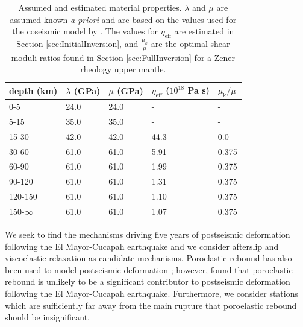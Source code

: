 \documentclass[draft,linenumbers]{AGUJournal}
\begin{document}
\begin{table}\label{tab:MaterialProperties}
\begin{tabular} {l l l l l}
depth (km) &$\lambda$ (GPa)&$\mu$ (GPa)&$\eta_\mathrm{eff}$ ($10^{18}$ Pa s) & $\mu_\mathrm{k}/\mu$\\ \hline
0-5 & 24.0 & 24.0 & - & -\\
5-15 & 35.0 & 35.0 & - & -\\
15-30 & 42.0 & 42.0 & 44.3 & 0.0\\
30-60 & 61.0 & 61.0 & 5.91 & 0.375\\
60-90 & 61.0 & 61.0 & 1.99 & 0.375\\
90-120 & 61.0 & 61.0 & 1.31 & 0.375\\
120-150 & 61.0 & 61.0 & 1.10 & 0.375\\
150-$\infty$ & 61.0 & 61.0 & 1.07 & 0.375\\
\end{tabular}
\caption{Assumed and estimated material properties. $\lambda$ and $\mu$ are assumed known \textit{a priori} and are based on the values used for the coseismic model by \citet{Wei2011}.  The values for $\eta_\mathrm{eff}$ are estimated in Section \ref{sec:InitialInversion}, and $\frac{\mu_k}{\mu}$ are the optimal shear moduli ratios found in Section \ref{sec:FullInversion} for a Zener rheology upper mantle.} 

\end{table}
We seek to find the mechanisms driving five years of postseismic deformation following the El Mayor-Cucapah earthquake and we consider afterslip and viscoelastic relaxation as candidate mechanisms.  Poroelastic rebound has also been used to model postseismic deformation \citep[e.g.][]{Jonsson2003}; however, \citet{Gonzalez-ortega2014} found that poroelastic rebound is unlikely to be a significant contributor to postseismic deformation following the El Mayor-Cucapah earthquake. Furthermore, we consider stations which are sufficiently far away from the main rupture that poroelastic rebound should be insignificant.  
\end{document}

